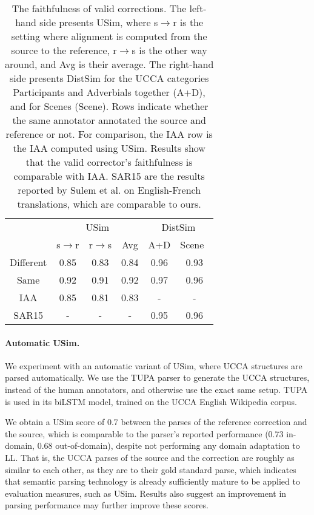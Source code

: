 \documentclass[a4paper, 11pt]{article}
\begin{document}
\begin{table}
	\vspace{-0.5cm}
  \small
  \centering
  \singlespacing
  \begin{tabular}{c|c|c|c||c|c|}
  	\cline{2-6} 
  	& \multicolumn{3}{c||}{\sc USim} & \multicolumn{2}{c|}{\sc DistSim}\\ \cline{2-6}
  	& s$\rightarrow$r & r$\rightarrow$s & Avg & A+D & Scene\
    \\
    \hline
    Different & 0.85 & 0.83 & 0.84 & 0.96 & 0.93
    \\
    Same & 0.92 & 0.91 & 0.92 & 0.97 & 0.96
    \\
    \hline
    \hline
    IAA & 0.85 & 0.81 & 0.83 & - & -
    \\
    \hline
    SAR15 & - & - & - & 0.95 & 0.96 \\
    \hline
  \end{tabular}
  \caption{\label{tab:Distances}
    The faithfulness of valid corrections.
    The left-hand side presents {\sc USim},
    where s$\rightarrow$r is the setting where alignment is computed from the source to the reference,
    r$\rightarrow$s is the other way around, and Avg is their average.
    The right-hand side presents {\sc DistSim} for the UCCA categories Participants and Adverbials
    together (A+D), and for Scenes (Scene).
    Rows indicate whether the same annotator annotated the source and reference or not.
    For comparison, the IAA row is the IAA computed using {\sc USim}.
    Results show that the valid corrector's faithfulness is comparable with IAA.
    SAR15 are the results reported by Sulem et al. on English-French
    translations, which are comparable to ours.}
\vspace{-0.6cm}
\end{table}

\vspace{-.2cm}
\paragraph{Automatic {\sc USim}.}

We experiment with an automatic variant of USim, where UCCA
structures are parsed automatically.
We use the TUPA parser \cite{hershcovich2017transition} to generate the UCCA structures,
instead of the human annotators, and otherwise use the exact same setup. 
TUPA is used in its biLSTM model, trained on the UCCA English Wikipedia corpus.

We obtain a {\sc USim} score of 0.7 between the parses of the reference
correction and the source, which is comparable to the parser's reported
performance (0.73 in-domain, 0.68 out-of-domain), despite not performing any
domain adaptation to LL. 
That is, the UCCA parses of the source and the correction are roughly as similar to each
other, as they are to their gold standard parse, which indicates 
that semantic parsing technology is already sufficiently mature to
be applied to evaluation measures, such as USim.
Results also suggest an improvement in parsing performance may further improve these scores.
\end{document}
